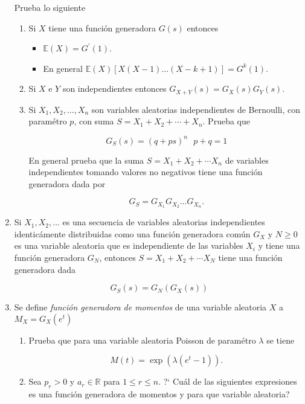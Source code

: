 \documentclass[a4paper,11pt]{report}
\begin{document}
\begin{enumerate}
\begin{enumerate}
\end{enumerate}


Prueba lo siguiente

\begin{enumerate}
	\item Si $X$ tiene una funci\'on generadora $G(s)$ entonces
	
	\begin{itemize}
		\item $\mathbb{E}(X) = G^{'}(1)$.
		\item  En general $\mathbb{E}(X)[X(X -1)\dots (X - k + 1)] = G^{k}(1)$.
	\end{itemize}
\item Si $X$ e $Y$ son independientes entonces $G_{X + Y }(s)  = G_{X}(s)G_{Y}(s)$.
\item Si $X_1, X_2, \dots, X_n$ son variables aleatorias independientes de Bernoulli, con param\'etro $p$, con suma $S = X_1 + X_2 + \cdots + X_n$. Prueba que

\[
G_S(s) = (q + ps)^n \ \ \ p +  q = 1
\]

En general prueba que la suma $S = X_1 + X_2 + \cdots X_n$ de variables independientes tomando valores no negativos tiene una funci\'on generadora  dada por

\[
G_S = G_{X_1}G_{X_2}\dots G_{X_n}.
\]
\end{enumerate}

\item Si $X_1, X_2, \dots $ es una secuencia de variables aleatorias independientes  identic\'amente distribuidas como una funci\'on generadora com\'un $G_X$ y $N \geq 0$ es una variable aleatoria que es independiente de las variables  $X_i$ y tiene una funci\'on generadora  $G_N$, entonces $S = X_1 + X_2 + \cdots X_N$ tiene una funci\'on generadora dada

\[
G_{S}(s) = G_{N}(G_{X}(s))
\]

\item Se define \textit{funci\'on generadora de momentos} de una variable aleatoria $X$ a $M_X = G_X(e ^t)$ 

\begin{enumerate}
	\item Prueba que para una variable aleatoria Poisson de param\'etro $\lambda$ se tiene
	
	\[
	M(t) = \exp(\lambda (e^t - 1)).
	\]
	
	\item Sea $p_r > 0$ y $a_r \in \mathbb{R}$ para $1 \leq r \leq n$. ?` Cu\'al  de las siguientes expresiones es una funci\'on generadora de momentos y para que variable aleatoria?
	

\end{enumerate}
\end{enumerate}
\end{document}
